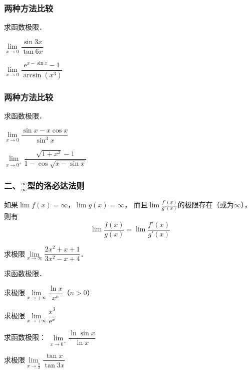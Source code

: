 \documentclass[14pt,notheorems,leqno,xcolor={rgb}]{beamer} %
\begin{document}
\begin{frame}
\frametitle{两种方法比较}
\begin{example}
求函数极限．
\begin{enumlite}
  \item $\lim\limits_{x\to0}\dfrac{\sin 3x}{\tan 6x}$\pause
  \item $\lim\limits_{x\to0}\dfrac{\mathrm{e}^{x-\sin x}-1}{\arcsin(x^3)}$
\end{enumlite}
\end{example}
\end{frame}

\begin{frame}
\frametitle{两种方法比较}
\begin{exercise}
求函数极限．
\begin{enumlite}
  \item $\lim\limits_{x\to0}\dfrac{\sin x-x\cos x}{\sin^3x}$
  \item $\lim\limits_{x\to0^+}\dfrac{\sqrt{1+x^3}-1}{1-\cos\sqrt{x-\sin x}}$
\end{enumlite}
\end{exercise}
\end{frame}

\begin{frame}
\frametitle{二、$\frac{\infty}{\infty}$型的洛必达法则}
\begin{theorem}
如果$\lim\limits f(x)=\infty$，$\lim\limits g(x)=\infty$，
而且$\lim\limits \frac{f'(x)}{g'(x)}$的极限存在（或为$\infty$），则有
\[\lim \frac{f(x)}{g(x)}=\lim\limits \frac{f'(x)}{g'(x)}\]
\end{theorem}\pause
\begin{example}
求极限$\lim\limits_{x\to\infty}\dfrac{2x^2+x+1}{3x^2-x+4}$．
\end{example}
\end{frame}

\begin{frame}
\begin{example}
求函数极限．
\begin{enumlite}
  \item 求极限$\lim\limits_{x\to+\infty}\dfrac{\ln x}{x^n}$（$n>0$）\pause
  \item 求极限$\lim\limits_{x\to+\infty}\dfrac{x^3}{\mathrm{e}^x}$\pause
\end{enumlite}
\end{example}\pause
\begin{exercise}
求函数极限：
$\lim\limits_{x\to0^+}\dfrac{\ln\sin x}{\ln x}$
\end{exercise}\pause
\begin{thinking}
求极限$\lim\limits_{x\to\frac{\pi}2}\dfrac{\tan x}{\tan 3x}$
\end{thinking}
\end{frame}
\end{document}
